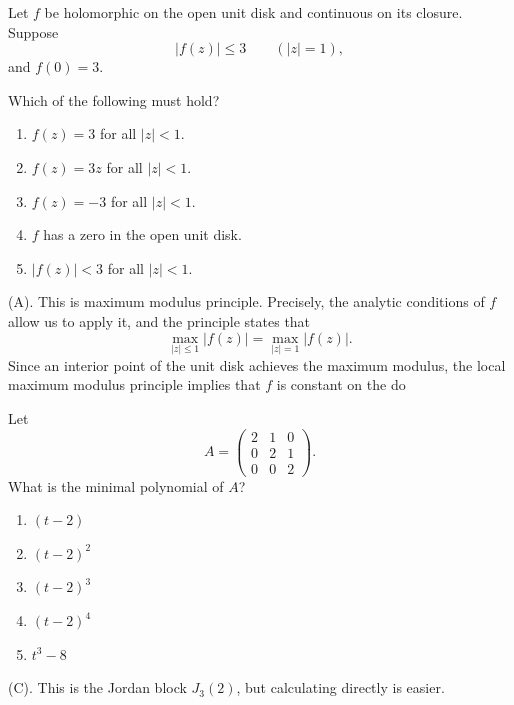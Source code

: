 \begin{exercise}
Let $f$ be holomorphic on the open unit disk
and continuous on its closure. Suppose
\[
|f(z)|\leq3\qquad (|z|=1),
\]
and $f(0)=3$.

Which of the following must hold?
\begin{enumerate}[label=(\Alph*)]
\item $f(z)=3$ for all $|z|<1$.
\item $f(z)=3z$ for all $|z|<1$.
\item $f(z)=-3$ for all $|z|<1$.
\item $f$ has a zero in the open unit disk.
\item $|f(z)|<3$ for all $|z|<1$.
\end{enumerate}
\end{exercise}
\begin{solution}
(A). This is maximum modulus principle. Precisely, the analytic conditions of $f$
allow us to apply it, and the principle states that 
\[
\max_{|z| \leq 1} |f(z)| = \max_{|z| = 1} |f(z)|.
\]
Since an interior point of the unit disk achieves the maximum modulus, the 
local maximum modulus principle implies that $f$ is constant on the do
\end{solution}

\begin{exercise}
Let
\[
A=
\begin{pmatrix}
2&1&0\\
0&2&1\\
0&0&2
\end{pmatrix}.
\]
What is the minimal polynomial of $A$?
\begin{enumerate}[label=(\Alph*)]
\item $(t-2)$
\item $(t-2)^2$
\item $(t-2)^3$
\item $(t-2)^4$
\item $t^3-8$
\end{enumerate}
\end{exercise}
\begin{solution}
(C). This is the Jordan block $J_3(2)$, but calculating directly is easier.
\end{solution}

